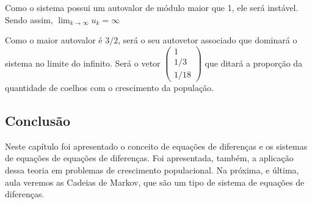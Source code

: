 \documentclass[12pt]{article}
\begin{document}
Como o sistema possui um autovalor de módulo maior que 1, ele será instável. Sendo assim, $\lim_{k\to\infty}u_k=\infty$

Como o maior autovalor é $3/2$, será o seu autovetor associado que dominará o sistema no limite do infinito. Será o vetor $\begin{pmatrix}
	1 \\
	1/3 \\
	1/18
\end{pmatrix}$ que ditará a proporção da quantidade de coelhos com o crescimento da população.

\subsection{Conclusão}
Neste capítulo foi apresentado o conceito de equações de diferenças e os sistemas de equações de equações de diferenças. Foi apresentada, também, a aplicação dessa teoria em problemas de crescimento populacional. Na próxima, e última, aula veremos as Cadeias de Markov, que são um tipo de sistema de equações de diferenças.
\end{document}
